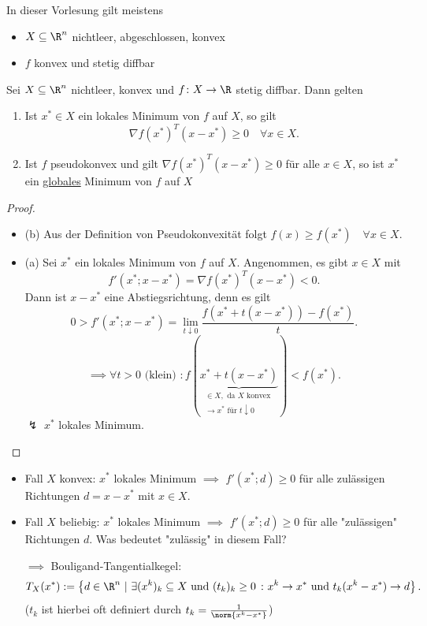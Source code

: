 In dieser Vorlesung gilt meistens
\begin{itemize}
	\item $X \subseteq \R^{n}$ nichtleer, abgeschlossen, konvex
	\item $f$ konvex und stetig diffbar
\end{itemize}

\begin{satz}[Minimierungsprinzip]
\label{thm:minimierungsprinzip}
	Sei $X \subseteq \R^{n}$ nichtleer, konvex und $f \colon X \rightarrow \R $ stetig diffbar. Dann gelten
	\begin{enumerate}[label=(\alph{enumi})]
		\item Ist $x^{*}\in X$ ein lokales Minimum von $f$ auf $X$, so gilt
			\[
				\nabla f(x^{*})^{T}(x-x^{*}) \geq 0 \quad \forall x \in X
			.\] 
		\item Ist $f$ pseudokonvex und gilt $\nabla f(x^{*})^{T}(x-x^{*})\geq 0$ für alle $x \in X$, so ist $x^{*}$ ein \underline{globales} Minimum von $f$ auf $X$
	\end{enumerate}
\end{satz}

\begin{proof}
\label{thm:minimierungsprinzipbeweis}
\begin{itemize}
	\item (b) Aus der Definition von Pseudokonvexität folgt $f(x) \geq f(x^{*})\quad \forall x \in X$.
	\item (a) Sei $x^{*}$ ein lokales Minimum von $f$ auf $X$. Angenommen, es gibt $x \in X$ mit
		\[
			f'(x^{*}; x- x^{*}) = \nabla f(x^{*})^{T}(x-x^{*}) < 0
		.\] 
		Dann ist $x-x^{*}$ eine Abstiegsrichtung, denn es gilt
		\[
			0 > f'(x^{*};x-x^{*}) = \lim_{t \downarrow 0} \frac{f(x^{*} + t(x-x^{*}))-f(x^{*})}{t}
		.\] 
		\[
			\implies \forall t > 0 \text{ (klein) }: f(\underbrace{x^{*}+t(x-x^{*})}_{\substack{\in X, \text{ da $X$ konvex }\\ \rightarrow x^{*} \text{ für } t \downarrow 0}} ) < f(x^{*})
		.\] 
		$\lightning$ $x^{*}$ lokales Minimum.
\end{itemize}
\end{proof}

\begin{itemize}
	\item Fall $X$ konvex: $x^{*}$ lokales Minimum $\implies$ $f'(x^{*};d)\geq 0$ für alle zulässigen Richtungen $d=x-x^{*}$ mit $x \in X$.
	\item Fall $X$ beliebig: $x^{*}$ lokales Minimum $\implies$ $f'(x^{*};d)\geq 0$ für alle "zulässigen" Richtungen $d$. Was bedeutet "zulässig" in diesem Fall?

		$\implies$ Bouligand-Tangentialkegel:
		\[
			T_{X}(x^{*}):= \left\{ d \in \R^{n} ~|~ \exists (x^{k})_{k} \subseteq X \text{ und } (t_{k})_{k}\geq 0 ~\colon x^{k} \rightarrow x^{*} \text{ und } t_{k}(x^{k}-x^{*}) \rightarrow d \right\} 
		.\] ($t_{k}$ ist hierbei oft definiert durch $t_{k}=\frac{1}{\norm{x^{k}- x^{*}} }$)
\end{itemize}

